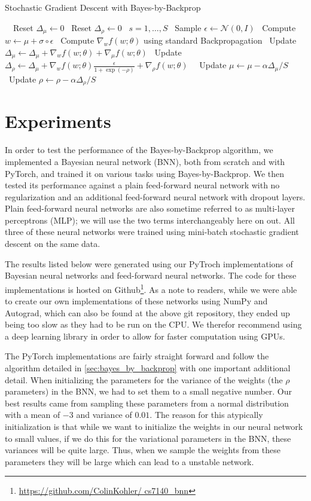 \documentclass[11pt]{article}
\begin{document}
\begin{algorithm}
\caption{Stochastic Gradient Descent with Bayes-by-Backprop}
\begin{algorithmic}[1]
  \Repeat\
  \State\ Reset $\Delta_\mu \gets 0$
  \State\ Reset $\Delta_\rho \gets 0$
  \For\ {$s = 1, \ldots, S$}
  \State\ Sample $\epsilon \gets \mathcal{N}(0, I)$
  \State\ Compute $w \gets \mu + \sigma \circ \epsilon$
  \State\ Compute $\nabla_w f(w; \theta)$ using standard Backpropagation
  \State\ Update $\Delta_\mu \gets \Delta_\mu + \nabla_w f(w; \theta) + \nabla_\mu f(w; \theta)$
  \State\ Update $\Delta_\rho \gets \Delta_\mu + \nabla_w f(w; \theta) \frac{\epsilon}{1+\exp(-\rho)} + \nabla_\rho f(w; \theta)$
  \EndFor\
  \State\ Update $\mu \gets \mu - \alpha \Delta_\mu / S$
  \State\ Update $\rho \gets \rho - \alpha \Delta_\rho / S$
  \Until{Convergence}
\end{algorithmic}
\end{algorithm}

\section{Experiments}

In order to test the performance of the Bayes-by-Backprop algorithm, we
implemented a Bayesian neural network (BNN), both from scratch and with
PyTorch, and trained it on various tasks using Bayes-by-Backprop.  We then
tested its performance against a plain feed-forward neural network with no
regularization and an additional feed-forward neural network with dropout
layers.  Plain feed-forward neural networks are also sometime referred to as
multi-layer perceptrons (MLP);  we will use the two terms interchangeably here
on out.  All three of these neural networks were trained using mini-batch
stochastic gradient descent on the same data.

The results listed below were generated using our PyTroch implementations of
Bayesian neural networks and feed-forward neural networks. The code for these
implementations is hosted on
Github\footnote{\url{https://github.com/ColinKohler/ cs7140_bnn}}. As a note to
readers, while we were able to create our own implementations of these networks
using NumPy and Autograd, which can also be found at the above git repository,
they ended up being too slow as they had to be run on the CPU\@. We therefor
recommend using a deep learning library in order to allow for faster
computation using GPUs. 

The PyTorch implementations are fairly straight forward and follow the 
algorithm detailed in \cref{sec:bayes_by_backprop} with one important 
additional detail. When initializing the parameters for the variance of the 
weights (the $\rho$ parameters) in the BNN, we had to set them to a small
negative number. Our best results came from sampling these parameters from
a normal distribution with a mean of $-3$ and variance of $0.01$. The reason
for this atypically initialization is that while we want to initialize the
weights in our neural network to small values, if we do this for the 
variational parameters in the BNN, these variances will be quite large. Thus,
when we sample the weights from these parameters they will be large which can
lead to a unstable network.
\end{document}
